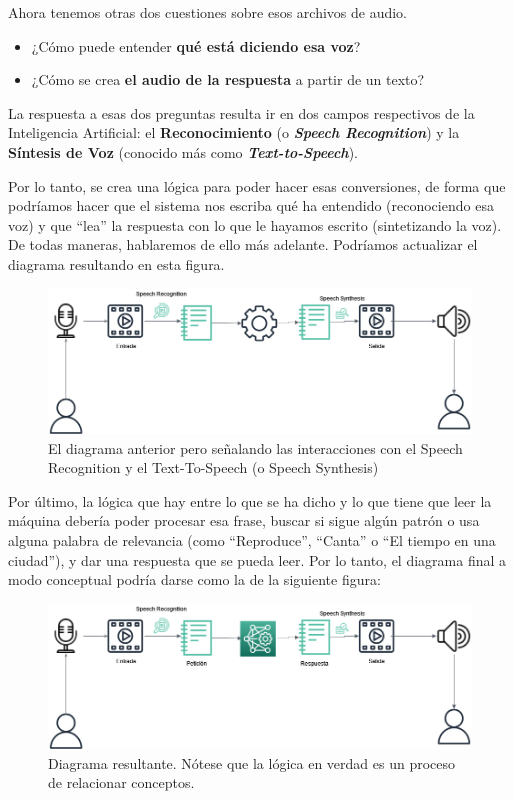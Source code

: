 Ahora tenemos otras dos cuestiones sobre esos archivos de audio.
\begin{itemize}
	\item ¿Cómo puede entender \textbf{qué está diciendo esa voz}?
	\item ¿Cómo se crea \textbf{el audio de la respuesta} a partir de un texto?
\end{itemize}
La respuesta a esas dos preguntas resulta ir en dos campos respectivos de la Inteligencia Artificial: el \textbf{Reconocimiento} (o \textit{\textbf{Speech Recognition}}) y la \textbf{Síntesis de Voz} (conocido más como \textbf{\textit{Text-to-Speech}}). 

Por lo tanto, se crea una lógica para poder hacer esas conversiones, de forma que podríamos hacer que el sistema nos escriba qué ha entendido (reconociendo esa voz) y que ``lea'' la respuesta con lo que le hayamos escrito (sintetizando la voz). De todas maneras, hablaremos de ello más adelante. Podríamos actualizar el diagrama resultando en esta figura.

\begin{figure}[H]
	\centering
	\includegraphics[width=1.1\textwidth]{imagenes/DiagramaTTS_SR.png}
	\caption[Diagrama con TTS/SR]{El diagrama anterior pero señalando las interacciones con el Speech Recognition y el Text-To-Speech (o Speech Synthesis)}
\end{figure}

Por último, la lógica que hay entre lo que se ha dicho y lo que tiene que leer la máquina debería poder procesar esa frase, buscar si sigue algún patrón o usa alguna palabra de relevancia (como ``Reproduce'', ``Canta'' o ``El tiempo en una ciudad''), y dar una respuesta que se pueda leer. Por lo tanto, el diagrama final a modo conceptual podría darse como la de la siguiente figura: 

\begin{figure}[H]
	\centering
	\includegraphics[width=1.1\textwidth]{imagenes/DiagramaIntuitivo.png}
	\caption[Diagrama intuitivo final.]{Diagrama resultante. Nótese que la lógica en verdad es un proceso de relacionar conceptos.}
\end{figure}

